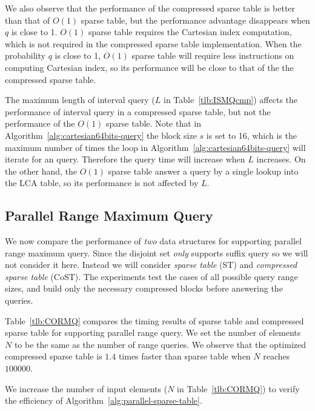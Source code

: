 We also observe that the performance of the compressed sparse table is
better than that of $O(1)$ sparse table, but the performance advantage
disappears when $q$ is close to 1. $O(1)$ sparse table requires the
Cartesian index computation, which is not required in the compressed
sparse table implementation.  When the probability $q$ is close to 1,
$O(1)$ sparse table will require less instructions on computing
Cartesian index, so its performance will be close to that of the the
compressed sparse table.

The maximum length of interval query ($L$ in Table~\ref{tlb:ISMQcmp})
affects the performance of interval query in a compressed sparse
table, but not the performance of the $O(1)$ sparse table.  Note that
in Algorithm~\ref{alg:cartesian64bits-query} the block size $s$ is set
to 16, which is the maximum number of times the loop in
Algorithm~\ref{alg:cartesian64bits-query} will iterate for an query.
Therefore the query time will increase when $L$ increases.  On the
other hand, the $O(1)$ sparse table answer a query by a single lookup
into the LCA table, so its performance is not affected by $L$.


\subsection{Parallel Range Maximum Query}

We now compare the performance of {\em two} data structures for
supporting parallel range maximum query.  Since the disjoint set {\em
  only} supports suffix query so we will not consider it here.
Instead we will consider {\em sparse table} ({\sc ST}) and {\em
  compressed sparse table} ({\sc CoST}).  The experiments test the
cases of all possible query range sizes, and build only the necessary
compressed blocks before answering the queries.

Table~\ref{tlb:CORMQ} compares the timing results of sparse table and
compressed sparse table for supporting parallel range query.  We set
the number of elements $N$ to be the same as the number of range
queries.  We observe that the optimized compressed sparse table is
$1.4$ times faster than sparse table when $N$ reaches $100000$.


We increase the number of input elements ($N$ in Table~\ref{tlb:CORMQ})
to verify the efficiency of Algorithm~\ref{alg:parallel-sparse-table}.

